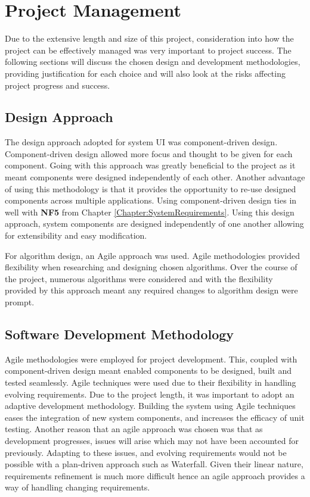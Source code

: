 \chapter{Project Management}
\label{Chapter:ProjectManagement}
Due to the extensive length and size of this project, consideration into how the project can be effectively
managed was very important to project success. The following sections will discuss the chosen design and development methodologies, providing justification for each choice and will also look at the risks affecting project progress and success.

\section{Design Approach}
The design approach adopted for system UI was component-driven design. Component-driven design allowed more focus and thought to be given for each component. Going with this approach was greatly beneficial to the project as it meant components were designed independently of each other. Another advantage of using this methodology is that it provides the opportunity to re-use designed components across multiple applications. Using component-driven design ties in well with \textbf{NF5} from Chapter \ref{Chapter:SystemRequirements}. Using this design approach, system components are designed independently of one another allowing for extensibility and easy modification.

For algorithm design, an Agile approach was used. Agile methodologies provided flexibility when researching and designing chosen algorithms. Over the course of the project, numerous algorithms were considered and with the flexibility provided by this approach meant any required changes to algorithm design were prompt.

\section{Software Development Methodology}
Agile methodologies were employed for project development. This, coupled with component-driven design meant enabled components to be designed, built and tested seamlessly. Agile techniques were used due to their flexibility in handling evolving requirements. Due to the project length, it was important to adopt an adaptive development methodology. Building the system using Agile techniques eases the integration of new system components, and increases the efficacy of unit testing. Another reason that an agile approach was chosen was that as development progresses, issues will arise which may not have been accounted for previously. Adapting to these issues, and evolving requirements would not be possible with a plan-driven approach such as Waterfall. Given their linear nature, requirements refinement is much more difficult hence an agile approach provides a way of handling changing requirements. 

